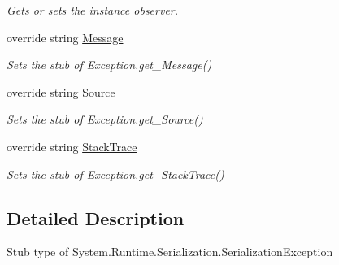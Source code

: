 \begin{DoxyCompactItemize}
\begin{DoxyCompactList}\small\item\em Gets or sets the instance observer.\end{DoxyCompactList}\item 
override string \hyperlink{class_system_1_1_runtime_1_1_serialization_1_1_fakes_1_1_stub_serialization_exception_a99a086201f61e2d0060b4268f5e10cf2}{Message}
\begin{DoxyCompactList}\small\item\em Sets the stub of Exception.\-get\-\_\-\-Message()\end{DoxyCompactList}\item 
override string \hyperlink{class_system_1_1_runtime_1_1_serialization_1_1_fakes_1_1_stub_serialization_exception_ad88c99b8c457f596e7d326e2831e2fcb}{Source}
\begin{DoxyCompactList}\small\item\em Sets the stub of Exception.\-get\-\_\-\-Source()\end{DoxyCompactList}\item 
override string \hyperlink{class_system_1_1_runtime_1_1_serialization_1_1_fakes_1_1_stub_serialization_exception_a688a98568087fe9bce140bb25a5b7adc}{Stack\-Trace}
\begin{DoxyCompactList}\small\item\em Sets the stub of Exception.\-get\-\_\-\-Stack\-Trace()\end{DoxyCompactList}\end{DoxyCompactItemize}


\subsection{Detailed Description}
Stub type of System.\-Runtime.\-Serialization.\-Serialization\-Exception



